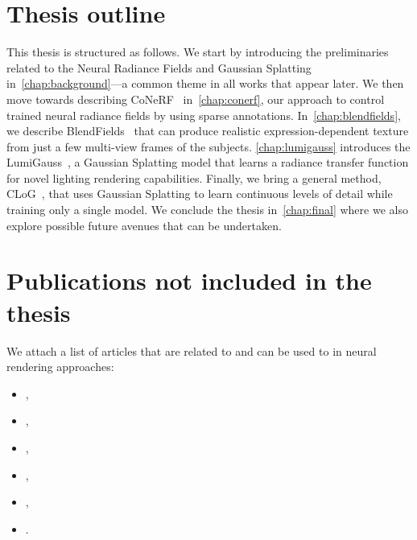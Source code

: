 \section{Thesis outline}
  This thesis is structured as follows.
  We start by introducing the preliminaries related to the Neural Radiance
  Fields and Gaussian Splatting in~\cref{chap:background}---a common theme in
  all works that appear later.
  We then move towards describing CoNeRF~\cite{kania2022conerf}
  in~\cref{chap:conerf}, our approach to control trained neural radiance
  fields by using sparse annotations.
  In~\cref{chap:blendfields}, we describe
  BlendFields~\cite{kania2023blendfields} that can produce realistic
  expression-dependent texture from just a few multi-view frames of the
  subjects.
  \cref{chap:lumigauss} introduces the LumiGauss~\cite{kaleta2024lumigauss}, a Gaussian Splatting model that learns a radiance transfer function for novel lighting rendering capabilities.
  Finally, we bring a general method, CLoG~\cite{kania2024clog}, that uses
  Gaussian Splatting to learn continuous levels of detail while training only
  a single model.
  We conclude the thesis in~\cref{chap:final} where we also explore possible
  future avenues that can be undertaken.

\section{Publications not included in the thesis}
  We attach a list of articles that are related to and can be used to in neural rendering approaches:
  \begin{itemize}
    \item\!\!\!,
    \item\!\!\!,
    \item\!\!\!\!\!,
    \item\!\!\!\!,
    \item\!\!\!,
    \item\!\!\!\!.
  \end{itemize}

